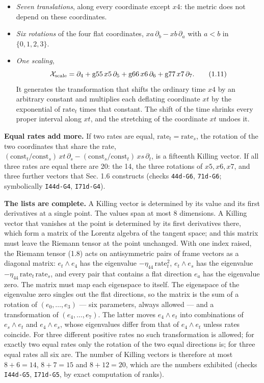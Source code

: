 \documentclass[
  10pt,
]{article}
\providecommand{\tightlist}{%
  \setlength{\itemsep}{0pt}\setlength{\parskip}{0pt}}
\begin{document}
\begin{itemize}
\tightlist
\item
  \emph{Seven translations}, along every coordinate except \(x4\): the
  metric does not depend on these coordinates.
\item
  \emph{Six rotations} of the four flat coordinates,
  \(xa\,\partial_b-xb\,\partial_a\) with \(a<b\) in \(\{0,1,2,3\}\).
\item
  \emph{One scaling},
  \[\mathcal X_{\rm scale}=\partial_4+\mathrm{g55}\,x5\,\partial_5+\mathrm{g66}\,x6\,\partial_6+\mathrm{g77}\,x7\,\partial_7 .\tag{1.11}\]
  It generates the transformation that shifts the ordinary time \(x4\)
  by an arbitrary constant and multiplies each deflating coordinate
  \(xt\) by the exponential of \(\mathrm{rate}_t\) times that constant.
  The shift of the time shrinks every proper interval along \(xt\), and
  the stretching of the coordinate \(xt\) undoes it.
\end{itemize}

\textbf{Equal rates add more.} If two rates are equal,
\(\mathrm{rate}_t=\mathrm{rate}_s\), the rotation of the two coordinates
that share the rate,
\((\mathrm{const}_t/\mathrm{const}_s)\,xt\,\partial_s-(\mathrm{const}_s/\mathrm{const}_t)\,xs\,\partial_t\),
is a fifteenth Killing vector. If all three rates are equal there are
20: the 14, the three rotations of \(x5,x6,x7\), and three further
vectors that Sec. 1.6 constructs (checks \texttt{44d-G6},
\texttt{71d-G6}; symbolically \texttt{I44d-G4}, \texttt{I71d-G4}).

\textbf{The lists are complete.} A Killing vector is determined by its
value and its first derivatives at a single point. The values span at
most 8 dimensions. A Killing vector that vanishes at the point is
determined by its first derivatives there, which form a matrix of the
Lorentz algebra of the tangent space; and this matrix must leave the
Riemann tensor at the point unchanged. With one index raised, the
Riemann tensor (1.8) acts on antisymmetric pairs of frame vectors as a
diagonal matrix: \(e_t\wedge e_4\) has the eigenvalue
\(-\eta_{44}\,\mathrm{rate}_t^2\), \(e_t\wedge e_s\) has the eigenvalue
\(-\eta_{44}\,\mathrm{rate}_t\,\mathrm{rate}_s\), and every pair that
contains a flat direction \(e_a\) has the eigenvalue zero. The matrix
must map each eigenspace to itself. The eigenspace of the eigenvalue
zero singles out the flat directions, so the matrix is the sum of a
rotation of \((e_0,\dots,e_3)\) --- six parameters, always allowed ---
and a transformation of \((e_4,\dots,e_7)\). The latter moves
\(e_4\wedge e_t\) into combinations of \(e_s\wedge e_t\) and
\(e_4\wedge e_s\), whose eigenvalues differ from that of
\(e_4\wedge e_t\) unless rates coincide. For three different positive
rates no such transformation is allowed; for exactly two equal rates
only the rotation of the two equal directions is; for three equal rates
all six are. The number of Killing vectors is therefore at most
\(8+6=14\), \(8+7=15\) and \(8+12=20\), which are the numbers exhibited
(checks \texttt{I44d-G5}, \texttt{I71d-G5}, by exact computation of
ranks).
\end{document}
